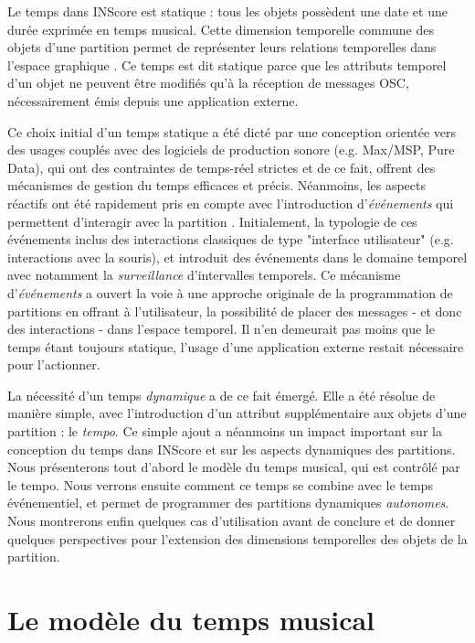 \documentclass{article}
\begin{document}
Le temps dans INScore \cite{Fober:12a} est statique : tous les objets possèdent une date et une durée exprimée en temps musical. Cette dimension temporelle commune des objets d'une partition  permet de représenter leurs relations temporelles dans l'espace graphique \cite{fober:10b}. Ce temps est dit statique parce que les attributs temporel d'un objet ne peuvent être modifiés qu'à la réception de messages OSC, nécessairement émis depuis une application externe.

Ce choix initial d'un temps statique a été dicté par une conception orientée vers des usages couplés avec des logiciels de production sonore (e.g. Max/MSP, Pure Data), qui ont des contraintes de temps-réel strictes et de ce fait, offrent des mécanismes de gestion du temps efficaces et précis. Néanmoins, les aspects réactifs ont été rapidement pris en compte avec l'introduction d'\textit{événements} qui permettent d'interagir avec la partition \cite{fober13a}. Initialement, la typologie de ces événements inclus des interactions classiques de type "interface utilisateur" (e.g. interactions avec la souris), et introduit des événements dans le domaine temporel avec notamment la \textit{surveillance} d'intervalles temporels. Ce mécanisme d'\textit{événements} a ouvert la voie à une approche originale de la programmation de partitions en offrant à l'utilisateur, la possibilité de placer des messages - et donc des interactions - dans l'espace temporel. Il n'en demeurait pas moins que le temps étant toujours statique, l'usage d'une application externe restait nécessaire pour l'actionner.

La nécessité d'un temps \emph{dynamique} a de ce fait émergé. Elle a été résolue de manière simple, avec l'introduction d'un attribut supplémentaire aux objets d'une partition : le \emph{tempo}. Ce simple ajout a néanmoins un impact important sur la conception du temps dans INScore et sur les aspects dynamiques des partitions. Nous présenterons tout d'abord le modèle du temps musical, qui est contrôlé par le tempo. Nous verrons ensuite comment ce temps se combine avec le temps événementiel, et permet de programmer des partitions dynamiques \emph{autonomes}. Nous montrerons enfin quelques cas d'utilisation avant de conclure et de donner quelques perspectives pour l'extension des dimensions temporelles des objets de la partition.


\section{Le modèle du temps musical}\label{mustime}
\end{document}
